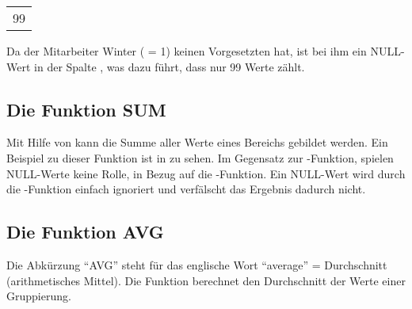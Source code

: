           \begin{center}
            \begin{small}
              \tablehead{}
              \begin{msoraclesql}
                \begin{supertabular}{r}
                  99 \\
                \end{supertabular}
              \end{msoraclesql}
            \end{small}
          \end{center}
          Da der Mitarbeiter Winter ( = 1) keinen Vorgesetzten hat, ist bei ihm ein NULL-Wert in der Spalte , was dazu f\"uhrt, dass  nur 99 Werte z\"ahlt.
      \subsection{Die Funktion SUM}
        Mit Hilfe von  kann die Summe aller Werte eines Bereichs gebildet werden. Ein Beispiel zu dieser Funktion ist in  zu sehen. Im Gegensatz zur -Funktion, spielen NULL-Werte keine Rolle, in Bezug auf die -Funktion. Ein NULL-Wert wird durch die -Funktion einfach ignoriert und verf\"alscht das Ergebnis dadurch nicht.
      \subsection{Die Funktion AVG}
        Die Abk\"urzung \enquote{AVG} steht f\"ur das englische Wort \enquote{average} = Durchschnitt (arithmetisches Mittel). Die Funktion  berechnet den Durchschnitt der Werte einer Gruppierung.

